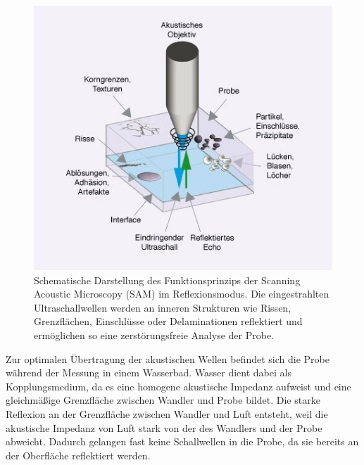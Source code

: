  \newpage
\vspace{0.2cm}
\begin{figure}
    \centering
    \includegraphics[scale=0.8]{Bilder/samtheorie}
    \caption{Schematische Darstellung des Funktionsprinzips der Scanning Acoustic Microscopy (SAM) im Reflexionsmodus. Die eingestrahlten Ultraschallwellen werden an inneren Strukturen wie Rissen, Grenzflächen, Einschlüsse oder Delaminationen reflektiert und ermöglichen so eine zerstörungsfreie Analyse der Probe.\cite{1}}
    \vspace{0.2cm}
    \label{Abb.1: Schematische Darstellung des Funktionsprinzips der Scanning Acoustic Microscopy (SAM) im Reflexionsmodus. Die eingestrahlten Ultraschallwellen werden an inneren Strukturen wie Rissen, Grenzflächen, Einschlüsse oder Delaminationen reflektiert und ermöglichen so eine zerstörungsfreie Analyse der Probe. }
\end{figure} 
\vspace{0.2cm}
Zur optimalen Übertragung der akustischen Wellen befindet sich die Probe während der Messung in einem Wasserbad. Wasser dient dabei als Kopplungsmedium, da es eine homogene akustische Impedanz aufweist und eine gleichmäßige Grenzfläche zwischen Wandler und Probe bildet.
Die starke Reflexion an der Grenzfläche zwischen Wandler und Luft entsteht, weil die akustische Impedanz von Luft stark von der des Wandlers und der Probe abweicht. Dadurch gelangen fast keine Schallwellen in die Probe, da sie bereits an der Oberfläche reflektiert werden.